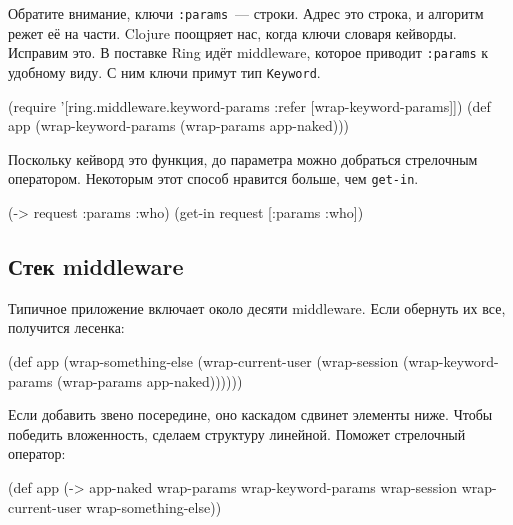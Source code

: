 
Обратите внимание, ключи \verb|:params|~--- строки. Адрес это строка, и
алгоритм режет её на части. Clojure поощряет нас, когда ключи словаря
кейворды. Исправим это. В поставке Ring идёт middleware, которое приводит
\verb|:params| к удобному виду. С ним ключи примут тип \verb|Keyword|.


\begin{english}
  \begin{clojure}
(require '[ring.middleware.keyword-params
           :refer [wrap-keyword-params]])
(def app (wrap-keyword-params (wrap-params app-naked)))
  \end{clojure}
\end{english}


Поскольку кейворд это функция, до параметра можно добраться стрелочным
оператором. Некоторым этот способ нравится больше, чем \verb|get-in|.

\begin{english}
  \begin{clojure}
(-> request :params :who)
(get-in request [:params :who])
  \end{clojure}
\end{english}

\subsection{Стек middleware}

Типичное приложение включает около десяти middleware. Если обернуть их все,
получится лесенка:

\begin{english}
  \begin{clojure}
(def app
  (wrap-something-else
    (wrap-current-user
      (wrap-session
        (wrap-keyword-params
          (wrap-params app-naked))))))
  \end{clojure}
\end{english}


Если добавить звено посередине, оно каскадом сдвинет элементы ниже. Чтобы
победить вложенность, сделаем структуру линейной. Поможет стрелочный оператор:


\begin{english}
  \begin{clojure/lines}
(def app
  (-> app-naked
      wrap-params
      wrap-keyword-params
      wrap-session
      wrap-current-user
      wrap-something-else))
  \end{clojure/lines}
\end{english}

